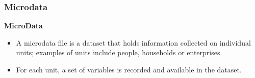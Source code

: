 \documentclass{beamer}
\begin{document}
\begin{frame}

\frametitle{Microdata}
\textbf{MicroData}
\begin{itemize}
	\item
A microdata file is a dataset that holds information collected on individual units;
examples of units include people, households or enterprises. 
\item For each unit, a set of
variables is recorded and available in the dataset. 
\end{itemize}
\end{frame}
\end{document}
